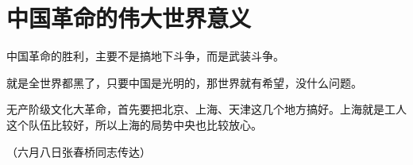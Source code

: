 \section[中国革命的伟大世界意义（一九六七年六月）]{中国革命的伟大世界意义}


中国革命的胜利，主要不是搞地下斗争，而是武装斗争。

就是全世界都黑了，只要中国是光明的，那世界就有希望，没什么问题。

无产阶级文化大革命，首先要把北京、上海、天津这几个地方搞好。上海就是工人这个队伍比较好，所以上海的局势中央也比较放心。

{\raggedleft （六月八日张春桥同志传达）\par}


